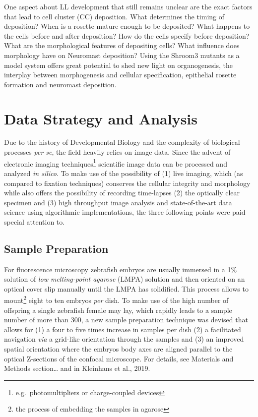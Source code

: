 \documentclass[11pt,singlespacinge,twoside]{reedthesis} %
\begin{document}
One aspect about LL development that still remains unclear are the exact factors that lead to cell cluster (CC) deposition. What determines the timing of deposition? When is a rosette mature enough to be deposited? What happens to the cells before and after deposition? How do the cells specify before deposition? What are the morphological features of depositing cells? What influence does morphology have on Neuromast deposition?
Using the Shroom3 mutants as a model system offers great potential to shed new light on organogenesis, the interplay between morphogenesis and cellular specification, epithelial rosette formation and neuromast deposition.

\hypertarget{data-strategy-and-analysis}{%
\section{Data Strategy and Analysis}\label{data-strategy-and-analysis}}

Due to the history of Developmental Biology and the complexity of biological processes \emph{per se}, the field heavily relies on image data. Since the advent of electronic imaging techniques\footnote{e.g.~photomultipliers or charge-coupled devices} scientific image data can be processed and analyzed \emph{in silico}. To make use of the possibility of (1) live imaging, which (as compared to fixation techniques) conserves the cellular integrity and morphology while also offers the possibility of recording time-lapses (2) the optically clear specimen and (3) high throughput image analysis and state-of-the-art data science using algorithmic implementations, the three following points were paid special attention to.

\hypertarget{sample-preparation}{%
\subsection{Sample Preparation}\label{sample-preparation}}

For fluorescence microscopy zebrafish embryos are usually immersed in a 1\% solution of \emph{low melting-point agarose} (LMPA) solution and then oriented on an optical cover slip manually until the LMPA has solidified. This process allows to mount\footnote{the process of embedding the samples in agarose} eight to ten embryos \emph{per} dish. To make use of the high number of offspring a single zebrafish female may lay, which rapidly leads to a sample number of more than 300, a new sample preparation technique was devised that allows for (1) a four to five times increase in samples per dish (2) a facilitated navigation \emph{via} a grid-like orientation through the samples and (3) an improved spatial orientation where the embryos body axes are aligned parallel to the optical Z-sections of the confocal microscope. For details, see Materials and Methods section\ldots{} and in Kleinhans et al., 2019.
\end{document}
